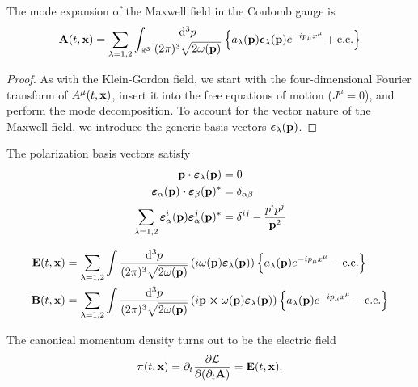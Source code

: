\begin{theorem}
	The mode expansion of the Maxwell field in the Coulomb gauge is
	\begin{equation}
		\vb{A}(t,\vb{x})
		=
		\sum_{\lambda=1,2}
		\int_{\mathbb{R}^3}\frac{\dd[3]{p}}{(2\pi)^3\sqrt{2\omega(\vb{p})}}
		\left\{
			a_\lambda(\vb{p})
			\boldsymbol{\epsilon}_\lambda(\vb{p})
			e^{-ip_\mu x^\mu}
			+
			\text{c.c.}
		\right\}
		\label{eq:mw_ft}
	\end{equation}
\end{theorem}
\begin{proof}
	As with the Klein-Gordon field, we start with the four-dimensional Fourier transform of $A^\mu(t,\vb{x})$, insert it into the free equations of motion ($J^\mu=0$), and perform the mode decomposition.
	To account for the vector nature of the Maxwell field, we introduce the generic basis vectors $\boldsymbol{\epsilon}_\lambda(\vb{p})$.
\end{proof}
\begin{theorem}
	The polarization basis vectors satisfy~\cite[p.~341]{Srednicki2007}
	\begin{align}
		\vb{p}
		\vdot
		\boldsymbol{\varepsilon}_\lambda(\vb{p})
		&=
		0
		\\
		\boldsymbol{\varepsilon}_\alpha(\vb{p})
		\vdot
		\boldsymbol{\varepsilon}_\beta(\vb{p})^*
		&=
		\delta_{\alpha\beta}
		\\
		\sum_{\lambda=1,2}
		\boldsymbol{\varepsilon}_\alpha^i(\vb{p})
		\boldsymbol{\varepsilon}_\alpha^j(\vb{p})^*
		&=
		\delta^{ij}
		-
		\frac{p^ip^j}{\vb{p}^2}
	\end{align}
\end{theorem}
\begin{theorem}
	\begin{align}
		\vb{E}(t,\vb{x})
		&=
		\sum_{\lambda=1,2}
		\int\frac{\dd[3]{p}}{(2\pi)^3\sqrt{2\omega(\vb{p})}}
		\left(
			i\omega(\vb{p})
			\boldsymbol{\varepsilon}_\lambda(\vb{p})
		\right)
		\left\{
			a_\lambda(\vb{p})
			e^{-ip_\mu x^\mu}
			-
			\text{c.c.}
		\right\}
		\\
		\vb{B}(t,\vb{x})
		&=
		\sum_{\lambda=1,2}
		\int\frac{\dd[3]{p}}{(2\pi)^3\sqrt{2\omega(\vb{p})}}
		\left(
			i\vb{p}\cross\omega(\vb{p})
			\boldsymbol{\varepsilon}_\lambda(\vb{p})
		\right)
		\left\{
			a_\lambda(\vb{p})
			e^{-ip_\mu x^\mu}
			-
			\text{c.c.}
		\right\}
	\end{align}
\end{theorem}
\begin{lemma}
	The canonical momentum density turns out to be the electric field
	\begin{equation}
		\pi(t,\vb{x})
		=
		\partial_t\pdv{\mathcal{L}}{(\partial_t\vb{A})}
		=
		\vb{E}(t,\vb{x})
		\label{eq:mw_mom}.
	\end{equation}
\end{lemma}
